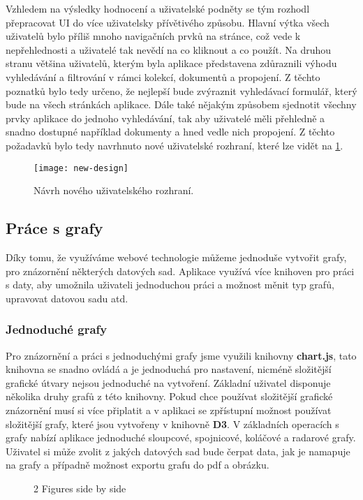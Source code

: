 \par Vzhledem na výsledky hodnocení a uživatelské podněty se tým rozhodl přepracovat UI do více uživatelsky přívětivého způsobu. Hlavní výtka všech uživatelů bylo příliš mnoho navigačních prvků na stránce, což vede k nepřehlednosti a uživatelé tak nevědí na co kliknout a co použít. Na druhou stranu většina uživatelů, kterým byla aplikace představena zdůraznili výhodu vyhledávání a filtrování v rámci kolekcí, dokumentů a propojení. Z těchto poznatků bylo tedy určeno, že nejlepší bude zvýraznit vyhledávací formulář, který bude na všech stránkách aplikace. Dále také nějakým způsobem sjednotit všechny prvky aplikace do jednoho vyhledávání, tak aby uživatelé měli přehledně a snadno dostupné například dokumenty a hned vedle nich propojení. Z těchto požadavků bylo tedy navrhnuto nové uživatelské rozhraní, které lze vidět na \ref{new-ui}.

\begin{figure}[htp]
\centering
\texttt{[image: new-design]}
\caption{Návrh nového uživatelského rozhraní.}
\label{new-ui}
\end{figure}

\subsection{Práce s grafy}
\par Díky tomu, že využíváme webové technologie můžeme jednoduše vytvořit grafy, pro znázornění některých datových sad. Aplikace využívá více knihoven pro práci s daty, aby umožnila uživateli jednoduchou práci a možnost měnit typ grafů, upravovat datovou sadu atd.

\subsubsection{Jednoduché grafy}
\par Pro znázornění a práci s jednoduchými grafy jsme využili knihovny \textbf{chart.js}, tato knihovna se snadno ovládá a je jednoduchá pro nastavení, nicméně složitější grafické útvary nejsou jednoduché na vytvoření. Základní uživatel disponuje několika druhy grafů z této knihovny. Pokud chce používat složitější grafické znázornění musí si více připlatit a v aplikaci se zpřístupní možnost používat složitější grafy, které jsou vytvořeny v knihovně \textbf{D3}. V základních operacích s grafy nabízí aplikace jednoduché sloupcové, spojnicové, koláčové a radarové grafy. Uživatel si může zvolit z jakých datových sad bude čerpat data, jak je namapuje na grafy a případně možnost exportu grafu do pdf a obrázku.
\begin{figure}[!htb]
\centering
{}%
%
%
\caption{2 Figures side by side}%
\label{fig:example}%
\end{figure}


